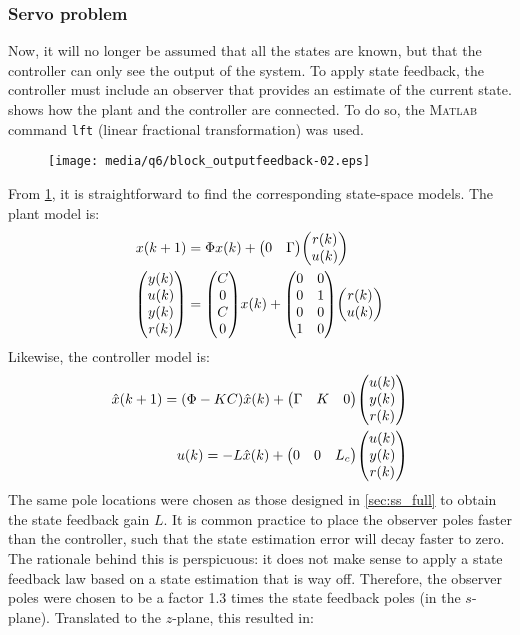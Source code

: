 \subsubsection{Servo problem}
Now, it will no longer be assumed that all the states are known, but that the controller can only see the output of the system. To apply state feedback, the controller must include an observer that provides an estimate of the current state.  shows how the plant and the controller are connected. To do so, the \textsc{Matlab} command \texttt{lft} (linear fractional transformation) was used.
\begin{figure}[ht]
    \centering
    \texttt{[image: media/q6/block\_outputfeedback-02.eps]}
    \caption{}
    \label{fig:q6_block_servo}
\end{figure}
From \cref{fig:q6_block_servo}, it is straightforward to find the corresponding state-space models. The plant model is:
\begin{equation}
    \begin{aligned}
        x(k+1) &= \Phi x(k) + \mqty(0&\Gamma)\mqty(r(k)\\u(k))\\
        \mqty(y(k)\\u(k)\\y(k)\\r(k)) &= \mqty(C\\0\\C\\0)x(k) + \mqty(0&0\\0&1\\0&0\\1&0) \mqty(r(k)\\u(k))
    \end{aligned}
\end{equation}
Likewise, the controller model is:
\begin{equation}
    \begin{aligned}
        \hat{x}(k+1) = (\Phi - KC)\hat{x}(k) + \mqty(\Gamma&K&0)\mqty(u(k)\\y(k)\\r(k))\\
        u(k) = -L\hat{x}(k) + \mqty(0&0&L_c)\mqty(u(k)\\y(k)\\r(k))
    \end{aligned}
\end{equation}
The same pole locations were chosen as those designed in \cref{sec:ss_full} to obtain the state feedback gain $L$. It is common practice to place the observer poles faster than the controller, such that the state estimation error will decay faster to zero. The rationale behind this is perspicuous: it does not make sense to apply a state feedback law based on a state estimation that is way off. Therefore, the observer poles were chosen to be a factor 1.3 times the state feedback poles (in the $s$-plane). Translated to the $z$-plane, this resulted in:
